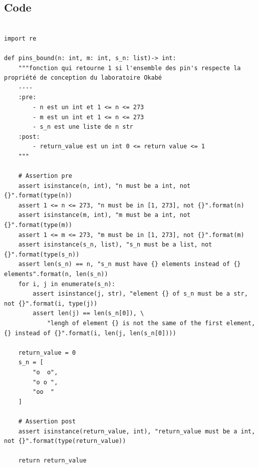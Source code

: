 \documentclass{article}
\begin{document}
        \subsection{Code}
            \begin{verbatim}

import re

def pins_bound(n: int, m: int, s_n: list)-> int:
    """fonction qui retourne 1 si l'ensemble des pin's respecte la propriété de conception du laboratoire Okabé
    ----
    :pre:
        - n est un int et 1 <= n <= 273
        - m est un int et 1 <= n <= 273
        - s_n est une liste de n str
    :post:
        - return_value est un int 0 <= return value <= 1
    """

    # Assertion pre
    assert isinstance(n, int), "n must be a int, not {}".format(type(n))
    assert 1 <= n <= 273, "n must be in [1, 273], not {}".format(n)
    assert isinstance(m, int), "m must be a int, not {}".format(type(m))
    assert 1 <= m <= 273, "m must be in [1, 273], not {}".format(m)
    assert isinstance(s_n, list), "s_n must be a list, not {}".format(type(s_n))
    assert len(s_n) == n, "s_n must have {} elements instead of {} elements".format(n, len(s_n))
    for i, j in enumerate(s_n):
        assert isinstance(j, str), "element {} of s_n must be a str, not {}".format(i, type(j))
        assert len(j) == len(s_n[0]), \
            "lengh of element {} is not the same of the first element, {} instead of {}".format(i, len(j, len(s_n[0])))

    return_value = 0
    s_n = [
        "o  o",
        "o o ",
        "oo  "
    ]

    # Assertion post
    assert isinstance(return_value, int), "return_value must be a int, not {}".format(type(return_value))

    return return_value

            \end{verbatim}
\end{document}
